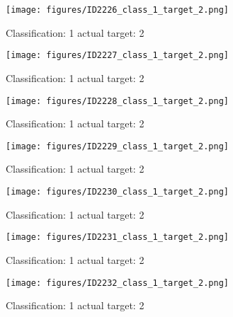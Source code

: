 \begin{figure}[h!]
\begin{center}
\texttt{[image: figures/ID2226\_class\_1\_target\_2.png]}
\end{center}
\caption{ Classification: 1 actual target: 2}
\label{fig:ID2226_class_1_target_2}
\end{figure}
\begin{figure}[h!]
\begin{center}
\texttt{[image: figures/ID2227\_class\_1\_target\_2.png]}
\end{center}
\caption{ Classification: 1 actual target: 2}
\label{fig:ID2227_class_1_target_2}
\end{figure}
\begin{figure}[h!]
\begin{center}
\texttt{[image: figures/ID2228\_class\_1\_target\_2.png]}
\end{center}
\caption{ Classification: 1 actual target: 2}
\label{fig:ID2228_class_1_target_2}
\end{figure}
\begin{figure}[h!]
\begin{center}
\texttt{[image: figures/ID2229\_class\_1\_target\_2.png]}
\end{center}
\caption{ Classification: 1 actual target: 2}
\label{fig:ID2229_class_1_target_2}
\end{figure}
\begin{figure}[h!]
\begin{center}
\texttt{[image: figures/ID2230\_class\_1\_target\_2.png]}
\end{center}
\caption{ Classification: 1 actual target: 2}
\label{fig:ID2230_class_1_target_2}
\end{figure}
\begin{figure}[h!]
\begin{center}
\texttt{[image: figures/ID2231\_class\_1\_target\_2.png]}
\end{center}
\caption{ Classification: 1 actual target: 2}
\label{fig:ID2231_class_1_target_2}
\end{figure}
\begin{figure}[h!]
\begin{center}
\texttt{[image: figures/ID2232\_class\_1\_target\_2.png]}
\end{center}
\caption{ Classification: 1 actual target: 2}
\label{fig:ID2232_class_1_target_2}
\end{figure}
